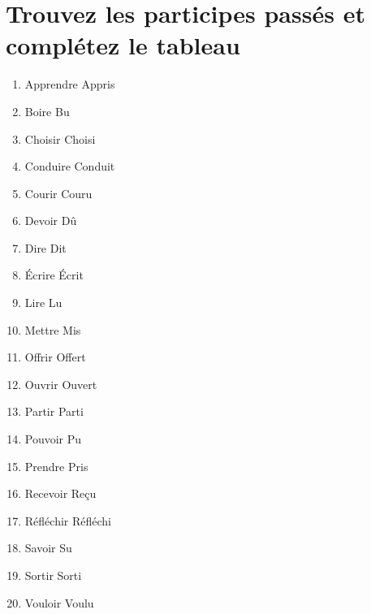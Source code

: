 \section{Trouvez les participes passés et complétez le tableau}

\begin{enumerate}
    \item Apprendre \rar Appris
    \item Boire \rar Bu 
    \item Choisir \rar Choisi
    \item Conduire \rar Conduit
    \item Courir \rar Couru
    \item Devoir \rar Dû
    \item Dire \rar Dit 
    \item Écrire \rar Écrit
    \item Lire \rar Lu 
    \item Mettre \rar Mis
    \item Offrir \rar Offert
    \item Ouvrir \rar Ouvert
    \item Partir \rar Parti 
    \item Pouvoir \rar Pu 
    \item Prendre \rar Pris
    \item Recevoir \rar Reçu
    \item Réfléchir \rar Réfléchi 
    \item Savoir \rar Su
    \item Sortir \rar Sorti
    \item Vouloir \rar Voulu
\end{enumerate}